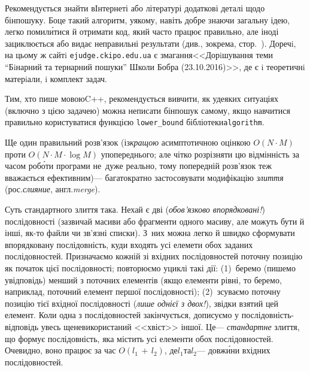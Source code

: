 Рекомендується знайти в\nolinebreak[3] Інтернеті або літературі додаткові деталі щодо бін\-пошуку. Бо\nolinebreak[3] це такий алгоритм, у\nolinebreak[3] якому, навіть добре знаючи загальну ідею, легко помил\'{и}тися й отримати код, який часто працює правильно, але іноді зациклюється або видає неправильні результати (див., зокрема, стор.~\pageref{text:binsearch-fails-examples}). 
До\nolinebreak[3] речi, на цьому ж сайтi \texttt{ejudge.ckipo.edu.ua} є змагання\nolinebreak[2] <<Дорiшування теми ``Бiнарний та тернарний пошуки'' Школи Бобра (23.10.2016)>>, де є i теоретичнi матерiали, i комплект задач.

Тим, хто пише мовою\nolinebreak[3] C++, рекомендується вивчити, як у\nolinebreak[3] деяких ситуаціях (включно з цією задачею) можна не\nolinebreak[3] писати бін\-пошук самому, якщо навчитися правильно користуватися функцією \verb"lower_bound" бібліотеки\nolinebreak[2] \texttt{algorithm}.


Ще один правильний розв'язок (із\nolinebreak[2] \emph{кращою} асимптотичною оцінкою $O(N{\cdot}M)$ проти $O(N{\cdot}M{\cdot}\log{}M)$ у\nolinebreak[3] попереднього; але чітко розрізняти цю відмінність за часом роб\'{о}ти програми не~дуже реально, тому попередній розв'язок теж вважається ефективним)\nolinebreak[3] --- багатократно застосовувати модифікацію \emph{злиття} (рос.\nolinebreak[3] \emph{слияние}, англ.\nolinebreak[3] \emph{merge}). %

\label{text:about-merge-in-omnipresent-task}%
Суть стандартного злиття така. Нехай є дві (\emph{обов'язково впорядковані!}) послідовності (зазвичай масиви або фрагменти одного масиву, але можуть бути й інші, як-то файли чи зв'язні списки). З~них можна легко й швидко сформувати впорядковану 
послідовність, куди входять усі елемети обох заданих послідовностей. 
Призначаємо кожній зі вхідних послідовностей поточну позицію як початок цієї послідовності; повторюємо у\nolinebreak[3] циклі такі дії: (1)~беремо (пишемо у\nolinebreak[3] відповідь) менший з поточних елементів (якщо елементи рівні, то беремо, наприклад, поточний елемент першої послідовності); (2)~зсуваємо поточну позицію тієї вхідної послідовності (\emph{лише однієї з двох!}), звідки взятий цей елемент. Коли одна з послідовностей закінчується, дописуємо у послі\-дов\-ність-від\-по\-відь увесь ще\nolinebreak[3] не\nolinebreak[3] використаний <<хвіст>> іншої. Це\nolinebreak[3] --- \emph{стандартне} злиття, що формує послідовність, яка містить усі елементи обох послідовностей. Очевидно, воно працює за час $O({l_1\,{+}\,l_2})$, де\nolinebreak[3] $l_1$\nolinebreak[1] та\nolinebreak[3] $l_2$\nolinebreak[3] --- довж\'{и}ни вхідних послідовностей.

